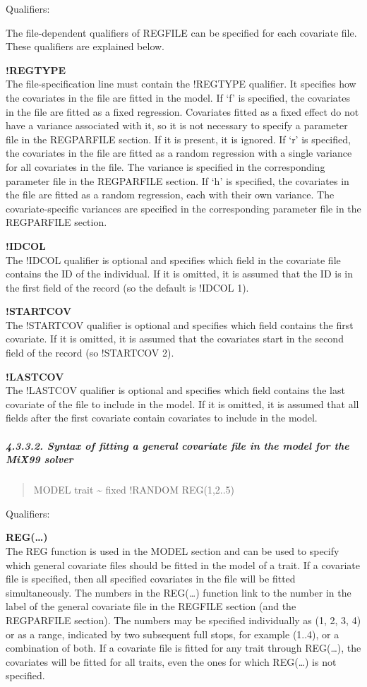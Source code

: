 Qualifiers:

The file-dependent qualifiers of REGFILE can be specified for each
covariate file. These qualifiers are explained below.

\textbf{!REGTYPE}\\
The file-specification line must contain the !REGTYPE qualifier. It
specifies how the covariates in the file are fitted in the model. If `f'
is specified, the covariates in the file are fitted as a fixed
regression. Covariates fitted as a fixed effect do not have a variance
associated with it, so it is not necessary to specify a parameter file
in the REGPARFILE section. If it is present, it is ignored. If `r' is
specified, the covariates in the file are fitted as a random regression
with a single variance for all covariates in the file. The variance is
specified in the corresponding parameter file in the REGPARFILE section.
If `h' is specified, the covariates in the file are fitted as a random
regression, each with their own variance. The covariate-specific
variances are specified in the corresponding parameter file in the
REGPARFILE section.

\textbf{!IDCOL}\\
The !IDCOL qualifier is optional and specifies which field in the
covariate file contains the ID of the individual. If it is omitted, it
is assumed that the ID is in the first field of the record (so the
default is !IDCOL 1).

\textbf{!STARTCOV}\\
The !STARTCOV qualifier is optional and specifies which field contains
the first covariate. If it is omitted, it is assumed that the covariates
start in the second field of the record (so !STARTCOV 2).

\textbf{!LASTCOV}\\
The !LASTCOV qualifier is optional and specifies which field contains
the last covariate of the file to include in the model. If it is
omitted, it is assumed that all fields after the first covariate contain
covariates to include in the model.

\subparagraph{4.3.3.2. Syntax of fitting a general covariate file in the
model for the MiX99 solver}\label{Obse23}

\begin{quote}
MODEL trait \textasciitilde{} fixed !RANDOM REG(1,2..5)
\end{quote}

Qualifiers:

\textbf{REG(\ldots)}\\
The REG function is used in the MODEL section and can be used to specify
which general covariate files should be fitted in the model of a trait.
If a covariate file is specified, then all specified covariates in the
file will be fitted simultaneously. The numbers in the REG(\ldots)
function link to the number in the label of the general covariate file
in the REGFILE section (and the REGPARFILE section). The numbers may be
specified individually as (1, 2, 3, 4) or as a range, indicated by two
subsequent full stops, for example (1..4), or a combination of both. If
a covariate file is fitted for any trait through REG(\ldots), the
covariates will be fitted for all traits, even the ones for which
REG(\ldots) is not specified.

